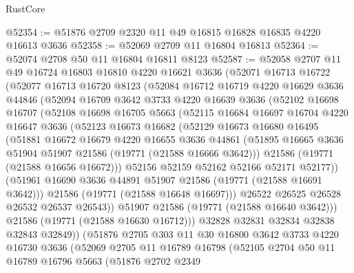 \begin{lexlean}{RustCore}
\begin{coremodule}
@52354 := @51876 @2709 @2320 @11 @49 @16815 @16828 @16835 @4220 @16613 @3636
@52358 := @52069 @2709 @11 @16804 @16813
@52364 := @52074 @2708 @50 @11 @16804 @16811 @8123
@52587 := @52058
    @2707
    @11
    @49
    @16724
    @16803
    @16810
    @4220
    @16621
    @3636
    (@52071
      @16713
      @16722
      (@52077
        @16713
        @16720
        @8123
        (@52084
          @16712
          @16719
          @4220
          @16629
          @3636
          @44846
          (@52094
            @16709
            @3642
            @3733
            @4220
            @16639
            @3636
            (@52102
              @16698
              @16707
              (@52108
                @16698
                @16705
                @5663
                (@52115
                  @16684
                  @16697
                  @16704
                  @4220
                  @16647
                  @3636
                  (@52123
                    @16673
                    @16682
                    (@52129
                      @16673
                      @16680
                      @16495
                      (@51881
                        @16672
                        @16679
                        @4220
                        @16655
                        @3636
                        @44861
                        (@51895 @16665 @3636 @51904 @51907 @21586 (@19771 (@21588 @16666 @3642)))
                        @21586
                        (@19771 (@21588 @16656 @16672)))
                      @52156
                      @52159
                      @52162
                      @52166
                      @52171
                      @52177))
                  (@51961 @16690 @3636 @44891 @51907 @21586 (@19771 (@21588 @16691 @3642)))
                  @21586
                  (@19771 (@21588 @16648 @16697)))
                @26522
                @26525
                @26528
                @26532
                @26537
                @26543))
            @51907
            @21586
            (@19771 (@21588 @16640 @3642)))
          @21586
          (@19771 (@21588 @16630 @16712)))
        @32828
        @32831
        @32834
        @32838
        @32843
        @32849))
    (@51876
      @2705
      @303
      @11
      @30
      @16800
      @3642
      @3733
      @4220
      @16730
      @3636
      (@52069
        @2705
        @11
        @16789
        @16798
        (@52105
          @2704
          @50
          @11
          @16789
          @16796
          @5663
          (@51876
            @2702
            @2349

\end{coremodule}
\end{lexlean}
